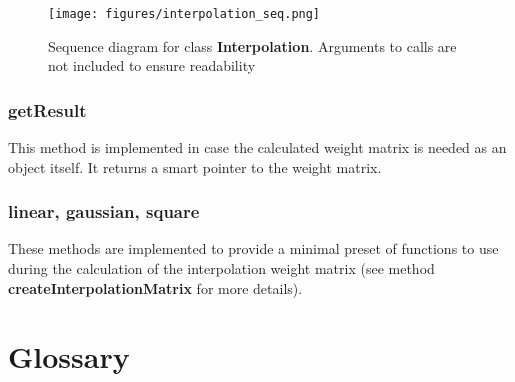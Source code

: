 \begin{figure}[h]
	\begin{center}
		\texttt{[image: figures/interpolation\_seq.png]}
		\caption{Sequence diagram for class \textbf{Interpolation}. Arguments to calls are not included to ensure readability}
	\end{center}
\end{figure}

\subsubsection{getResult}
This method is implemented in case the calculated weight matrix is needed as an object itself. It returns a smart pointer to the weight matrix.

\subsubsection{linear, gaussian, square}
These methods are implemented to provide a minimal preset of functions to use during the calculation of the interpolation weight matrix (see method \textbf{createInterpolationMatrix} for more details).

\clearpage

\section{Glossary}

